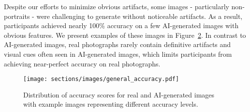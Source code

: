 Despite our efforts to minimize obvious artifacts, some images - particularly non-portraits - were challenging to generate without noticeable artifacts. As a result, participants achieved nearly 100\% accuracy on a few AI-generated images with obvious features. We present examples of these images in Figure~\ref{fig:three-fake-images}.  %
In contrast to AI-generated images, real photographs rarely contain definitive artifacts and visual cues often seen in AI-generated images, which limits participants from achieving near-perfect accuracy on real photographs.
\begin{figure}[H]
    \centering
    \texttt{[image: sections/images/general\_accuracy.pdf]}
    \caption{Distribution of accuracy scores for real and AI-generated images with example images representing different accuracy levels.}
    \label{fig:accuracy_real_fake}
\end{figure}
\begin{figure}[H]
\centering
\captionsetup{justification=raggedright, singlelinecheck=false, skip=2pt, font=small}
\begin{subfigure}[t]{0.3\linewidth}
    \subcaption{}
\end{subfigure}
\hfill
\begin{subfigure}[t]{0.3\linewidth}
    \subcaption{}
\end{subfigure}
\hfill
\begin{subfigure}[t]{0.3\linewidth}
    \subcaption{}
\end{subfigure}
\caption{ }
\label{fig:three-fake-images}
\end{figure}

